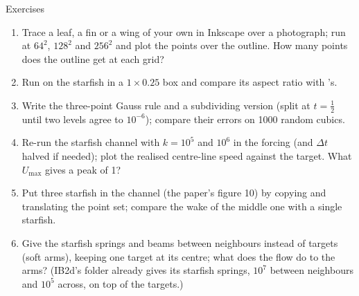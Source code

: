 \documentclass[aspectratio=169,11pt]{beamer}
\begin{document}
\begin{frame}{Exercises}
\label{fr:exercises}
\small
\begin{enumerate}
  \item Trace a leaf, a fin or a wing of your own in Inkscape over a photograph; run  at $64^2$, $128^2$ and $256^2$ and plot the points over the outline. How many points does the outline get at each grid?
  \item Run  on the starfish in a $1 \times 0.25$ box and compare its aspect ratio with 's.
  \item Write the three-point Gauss rule and a subdividing version (split at $t = \frac12$ until two levels agree to $10^{-6}$); compare their errors on 1000 random cubics.
  \item Re-run the starfish channel with $k = 10^5$ and $10^6$ in the forcing (and $\Delta t$ halved if needed); plot the realised centre-line speed against the target. What $U_{\max}$ gives a peak of 1?
  \item Put three starfish in the channel (the paper's figure 10) by copying and translating the point set; compare the wake of the middle one with a single starfish.
  \item Give the starfish springs and beams between neighbours instead of targets (soft arms), keeping one target at its centre; what does the flow do to the arms? (IB2d's  folder already gives its starfish springs, $10^7$ between neighbours and $10^5$ across, on top of the targets.)
\end{enumerate}
\end{frame}
\end{document}
